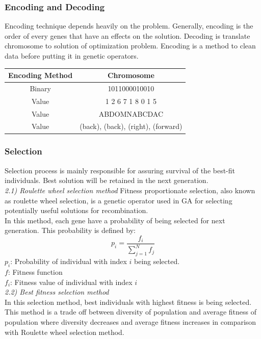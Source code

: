 \documentclass[conference]{IEEEtran}
\begin{document}
\subsubsection{Encoding and Decoding} \label{encode}
Encoding technique depends heavily on the problem. Generally, encoding is the order of every genes that have an effects on the solution. Decoding is translate chromosome to solution of optimization problem. Encoding is a method to clean data before putting it in genetic operators.
\begin{center}
 \begin{tabular}{||c c||} 
 \hline
 Encoding Method & Chromosome \\ 
 \hline\hline
 Binary & 1011000010010  \\ 
 \hline
 Value & 1 2 6 7 1 8 0 1 5 \\
 \hline
 Value & ABDOMNABCDAC \\
 \hline
 Value & (back), (back), (right), (forward)\\[1ex] 
 \hline
\end{tabular}
\end{center}
\subsubsection{Selection}
Selection process is mainly responsible for assuring survival of the best-fit
individuals. Best solution will be retained in the next generation.
\\
\indent
\indent
\textit{2.1) Roulette wheel selection method}
Fitness proportionate selection, also known as roulette wheel selection, is a genetic operator used in GA for selecting potentially useful solutions for recombination.\\
In this method, each gene have a probability of being selected for next generation. This probability is defined by:
\begin{equation} \label{eq:1}
p_i = \frac{f_i}{\sum_{j=1}^{N}f_j}
\end{equation}
$p_i$: Probability of individual with index $i$ being selected.\\
$f$: Fitness function\\
$f_i$: Fitness value of individual with index $i$\\
\indent
\indent
\textit{2.2) Best fitness selection method}\\
In this selection method, best individuals with highest fitness is being selected. This method is a trade off between diversity of population and average fitness of population where diversity decreases and average fitness increases in comparison with Roulette wheel selection method.
\end{document}
